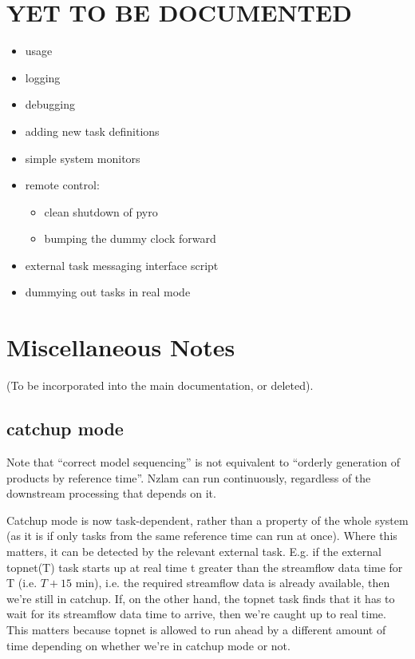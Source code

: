 \documentclass[11pt,a4paper]{report}
\begin{document}
\chapter{YET TO BE DOCUMENTED}

\begin{itemize}
 \item usage
 \item logging
 \item debugging
 \item adding new task definitions
 \item simple system monitors
 \item remote control: 
    \begin{itemize}
    \item clean shutdown of pyro
    \item bumping the dummy clock forward
    \end{itemize}
 \item external task messaging interface script
 \item dummying out tasks in real mode
\end{itemize}

\chapter{Miscellaneous Notes}

(To be incorporated into the main documentation, or deleted).

\section{catchup mode}

Note that ``correct model sequencing'' is not equivalent to ``orderly
generation of products by reference time''.  Nzlam can run continuously,
regardless of the downstream processing that depends on it.

Catchup mode is now task-dependent, rather than a property of the whole
system (as it is if only tasks from the same reference time can run at
once).  Where this matters, it can be detected by the relevant external
task. E.g. if the external topnet(T) task starts up at real time t
greater than the streamflow data time for T (i.e. $T+15$ min), i.e. the
required streamflow data is already available, then we're still in
catchup. If, on the other hand, the topnet task finds that it has to
wait for its streamflow data time to arrive, then we're caught up to
real time.  This matters because topnet is allowed to run ahead by a
different amount of time depending on whether we're in catchup mode or
not.
\end{document}
